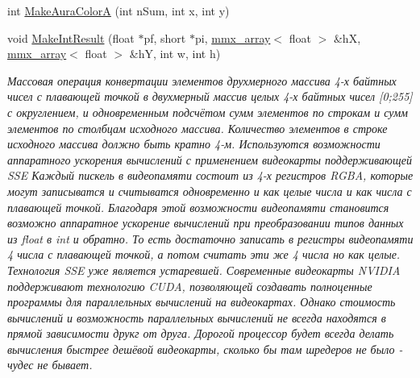 \begin{DoxyCompactItemize}
\item 
int \hyperlink{class_c_v_i_engine_thread_a5c5e1e4c1a32d38b39af4547ed4b5827}{Make\+Aura\+Color\+A} (int n\+Sum, int x, int y)
\item 
void \hyperlink{class_c_v_i_engine_thread_a77e3066544a8804d4cc5250ac9f4c54b}{Make\+Int\+Result} (float $\ast$pf, short $\ast$pi, \hyperlink{classmmx__array}{mmx\+\_\+array}$<$ float $>$ \&h\+X, \hyperlink{classmmx__array}{mmx\+\_\+array}$<$ float $>$ \&h\+Y, int w, int h)
\begin{DoxyCompactList}\small\item\em Массовая операция конвертации элементов друхмерного массива 4-\/х байтных чисел с плавающей точкой в двухмерный массив целых 4-\/х байтных чисел \mbox{[}0;255\mbox{]} с округлением, и одновременным подсчётом сумм элементов по строкам и сумм элементов по столбцам исходного массива. Количество элементов в строке исходного массива должно быть кратно 4-\/м. Используются возможности аппаратного ускорения вычислений с применением видеокарты поддерживающей S\+S\+E Каждый пискель в видеопамяти состоит из 4-\/х регистров R\+G\+B\+A, которые могут записыватся и считыватся одновременно и как целые числа и как числа с плавающей точкой. Благодаря этой возможности видеопамяти становится возможно аппаратное ускорение вычислений при преобразовании типов данных из float в int и обратно. То есть достаточно записать в регистры видеопамяти 4 числа с плавающей точкой, а потом считать эти же 4 числа но как целые. Технология S\+S\+E уже является устаревшей. Современные видеокарты N\+V\+I\+D\+I\+A поддерживают технологию C\+U\+D\+A, позволяющей создавать полноценные программы для параллельных вычислений на видеокартах. Однако стоимость вычислений и возможность параллельных вычислений не всегда находятся в прямой зависимости друкг от друга. Дорогой процессор будет всегда делать вычисления быстрее дешёвой видеокарты, сколько бы там шредеров не было -\/ чудес не бывает. \end{DoxyCompactList}\end{DoxyCompactItemize}
